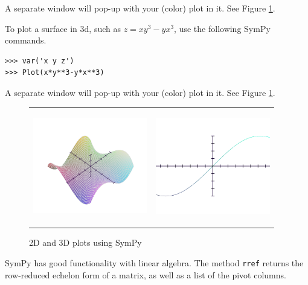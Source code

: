 \documentclass[12pt]{article}
\begin{document}
\noindent
A separate window will pop-up with your (color) plot in it.
See Figure \ref{fig:sympy-plots}.

To plot a surface in 3d, such as $z=xy^3-yx^3$,
use the following SymPy commands.

\begin{Verbatim}[fontsize=\scriptsize,fontfamily=courier,fontshape=tt,frame=single,label=SymPy]
>>> var('x y z')
>>> Plot(x*y**3-y*x**3)
\end{Verbatim}

\noindent
A separate window will pop-up with your (color) plot in it.
See Figure \ref{fig:sympy-plots}.


\begin{figure}[h!]
\begin{minipage}{\textwidth}
\begin{center}
\begin{tabular}{cc}
\includegraphics[height=5cm,width=5cm]{oscas-sympy-plot1b}
 &\includegraphics[height=5cm,width=5cm]{oscas-sympy-plot2b} \\
\end{tabular}
\end{center}
\end{minipage}
\caption{2D and 3D plots using SymPy}
\label{fig:sympy-plots}
\end{figure}

SymPy has good functionality with linear algebra.
The method {\tt rref} returns the row-reduced echelon form of a matrix,
as well as a list of the pivot columns.
\end{document}
